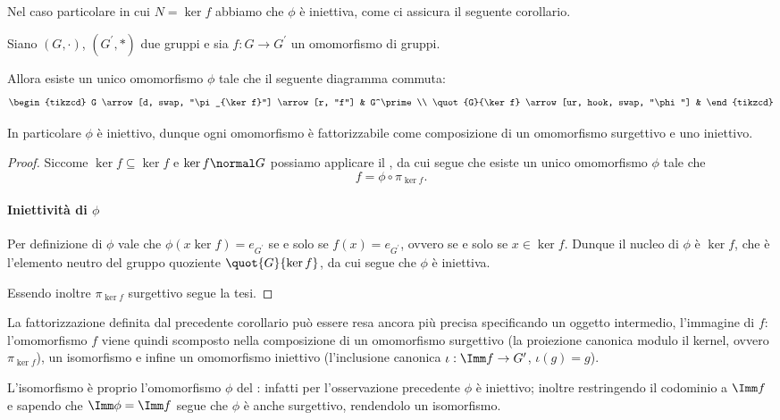 Nel caso particolare in cui $N = \ker f$ abbiamo che $\phi$ è iniettiva, come ci assicura il seguente corollario.

\begin{corollary}
    Siano $(G, \cdot)$, $(G^\prime, *)$ due gruppi e sia $f : G \to G^\prime$ un omomorfismo di gruppi. 
    
    Allora esiste un unico omomorfismo $\phi$ tale che il seguente diagramma commuta:
    \begin{equation}
        \begin{tikzcd}
            G \arrow[d, swap, "\pi_{\ker f}"] \arrow[r, "f"] & G^\prime \\
            \quot{G}{\ker f} \arrow[ur, hook, swap, "\phi"] &
        \end{tikzcd}
    \end{equation}

    In particolare $\phi$ è iniettivo, dunque ogni omomorfismo è fattorizzabile come composizione di un omomorfismo surgettivo e uno iniettivo.
\end{corollary}
\begin{proof}
    Siccome $\ker f \subseteq \ker f$ e $\ker f \normal G$ possiamo applicare il , da cui segue che esiste un unico omomorfismo $\phi$ tale che \[
        f = \phi \circ \pi_{\ker f}.    
    \]

    \paragraph{Iniettività di $\phi$} Per definizione di $\phi$ vale che $\phi(x\ker f) = e_{G^\prime}$ se e solo se $f(x) = e_{G^\prime}$, ovvero se e solo se $x \in \ker f$. Dunque il nucleo di $\phi$ è $\ker f$, che è l'elemento neutro del gruppo quoziente $\quot{G}{\ker f}$, da cui segue che $\phi$ è iniettiva. 

    Essendo inoltre $\pi_{\ker f}$ surgettivo segue la tesi.
\end{proof}

La fattorizzazione definita dal precedente corollario può essere resa ancora più precisa specificando un oggetto intermedio, l'immagine di $f$: l'omomorfismo $f$ viene quindi scomposto nella composizione di un omomorfismo surgettivo (la proiezione canonica modulo il kernel, ovvero $\pi_{\ker f}$), un isomorfismo e infine un omomorfismo iniettivo (l'inclusione canonica $\iota : \Imm f \to G^\prime$, $\iota(g) = g$). 

L'isomorfismo è proprio l'omomorfismo $\phi$ del : infatti per l'osservazione precedente $\phi$ è iniettivo; inoltre restringendo il codominio a $\Imm f$ e sapendo che $\Imm \phi = \Imm f$ segue che $\phi$ è anche surgettivo, rendendolo un isomorfismo.

